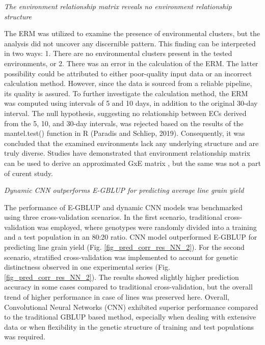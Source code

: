 \documentclass[english, biblatex]{lni}
\begin{document}
\textit{The environment relationship matrix reveals no environment relationship structure}

The ERM was utilized to examine the presence of environmental clusters, but the analysis did not uncover any discernible pattern. This finding can be interpreted in two ways: 1. There are no environmental clusters present in the tested environments, or 2. There was an error in the calculation of the ERM. The latter possibility could be attributed to either poor-quality input data or an incorrect calculation method. However, since the data is sourced from a reliable pipeline, its quality is assured. To further investigate the calculation method, the ERM was computed using intervals of 5 and 10 days, in addition to the original 30-day interval. The null hypothesis, suggesting no relationship between ECs derived from the 5, 10, and 30-day intervals, was rejected based on the results of the mantel.test() function in R (Paradis and Schliep, 2019). Consequently, it was concluded that the examined environments lack any underlying structure and are truly diverse. Studies have demonstrated that environment relationship matrix can be used to derive an approximated GxE matrix \cite{de2020data}, but the same was not a part of curent study. 

\textit{Dynamic CNN outperforms E-GBLUP for predicting average line grain yield} 

The performance of E-GBLUP and dynamic CNN models was benchmarked using three cross-validation scenarios. In the first scenario, traditional cross-validation was employed, where genotypes were randomly divided into a training and a test population in an 80:20 ratio. CNN model outperformed E-GBLUP for predicting line grain yield (Fig. \ref{fig_pred_corr_res_NN_2}). For the second scenario, stratified cross-validation was implemented to account for genetic distinctness observed in one experimental series (Fig. \ref{fig_pred_corr_res_NN_2}). The results showed slightly higher prediction accuracy in some cases compared to traditional cross-validation, but the overall trend of higher performance in case of lines was preserved here. Overall, Convolutional Neural Networks (CNN) exhibited superior performance compared to the traditional GBLUP based method, especially when dealing with extensive data or when flexibility in the genetic structure of training and test populations was required.
\end{document}
